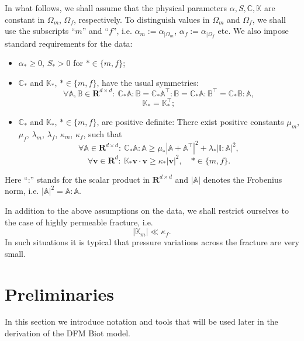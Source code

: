 \documentclass[a4paper]{article}
\numberwithin{equation}{section}
\def\CC{\tn C}
\def\Real{{\mathbf R}} %
\def\tn#1{{\mathbb{#1}}}    %
\def\vc#1{\mathbf{#1}}     %
\def\vv{\vc v}
\newcommand{\eq}[1]{\begin{equation}#1\end{equation}}
\newcommand{\eqs}[1]{\begin{equation*}#1\end{equation*}}
\begin{document}
In what follows, we shall assume that the physical parameters $\alpha,S,\CC,\tn K$ are constant in $\Omega_m$, $\Omega_f$, respectively.
To distinguish values in $\Omega_m$ and $\Omega_f$, we shall use the subscripts ``$m$'' and ``$f$'', i.e. $\alpha_m := \alpha_{|\Omega_m}$, $\alpha_f := \alpha_{|\Omega_f}$ etc.
We also impose standard requirements for the data:
\begin{itemize}
\item $\alpha_*\ge 0$, $S_*>0$ for $*\in\{m,f\}$;
\item $\CC_*$ and $\tn K_*$, $*\in\{m,f\}$, have the usual symmetries:
\eqs{ \forall \tn A,\tn B\in\Real^{d\times d}:~ \CC_*\tn A:\tn B=\CC_*\tn A^\top:\tn B=\CC_*\tn A:\tn B^\top=\CC_*\tn B:\tn A, }
\eqs{ \tn K_* = \tn K_*^\top; }
\item $\CC_*$ and $\tn K_*$, $*\in\{m,f\}$, are positive definite: %
There exist positive constants $\mu_m$, $\mu_f$, $\lambda_m$, $\lambda_f$, $\kappa_m$, $\kappa_f$, such that
\eq{ \label{eq:pos_def_C_gen} \forall\tn A\in\Real^{d\times d}:~\CC_*\tn A:\tn A \ge \mu_*\left|\tn A+\tn A^\top\right|^2 + \lambda_*|\tn I:\tn A|^2, }
\eq{ \label{eq:pos_def_K} \forall\vv\in\Real^d:~\tn K_*\vv\cdot\vv \ge \kappa_*|\vv|^2,\quad *\in\{m,f\}. }
\end{itemize}
Here ``:'' stands for the scalar product in $\Real^{d\times d}$ and $|\tn A|$ denotes the Frobenius norm, i.e. $|\tn A|^2=\tn A:\tn A$.

In addition to the above assumptions on the data, we shall restrict ourselves to the case of highly permeable fracture, i.e.
\eq{\label{eq:asm_permeable_frac} |\tn K_m|\ll \kappa_f. }
In such situations it is typical that pressure variations across the fracture are very small.


\section{Preliminaries}\label{sec:calculus}

In this section we introduce notation and tools that will be used later in the derivation of the DFM Biot model.
\end{document}
